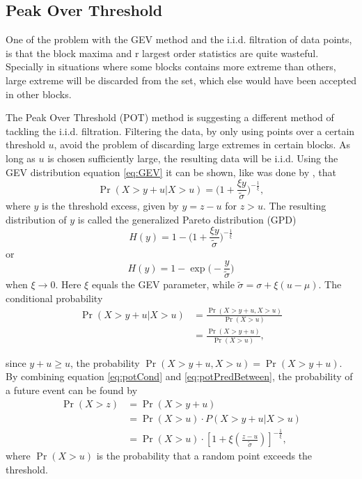 \subsection{Peak Over Threshold} 
One of the problem with the GEV method and the i.i.d. filtration of data points, is that the block maxima and r largest order statistics are quite wasteful. Specially in situations where some blocks contains more extreme than others, large extreme will be discarded from the set, which else would have been accepted in other blocks.

The Peak Over Threshold (POT) method is suggesting a different method of tackling the i.i.d. filtration. Filtering the data, by only using points over a certain threshold $u$, avoid the problem of discarding large extremes in certain blocks. As long as $u$ is chosen sufficiently large, the resulting data will be i.i.d. Using the GEV distribution equation \eqref{eq:GEV} it can be shown, like was done by \cite[p.~76]{stuart}, that 
\begin{equation}
\label{eq:potCond}
\Pr(X>y+u|X>u)=\Big(1+\frac{\xi y}{\tilde{\sigma}}\Big)^{-\frac{1}{\xi}},
\end{equation}
where $y$ is the threshold excess, given by $y=z-u$ for $z>u$.
The resulting distribution of $y$ is called the generalized Pareto distribution (GPD)
\begin{equation}
\label{eq:potwxi}
H(y)=1-\Big(1+\frac{\xi y}{\tilde{\sigma}}\Big)^{-\frac{1}{\xi}}
\end{equation}  
or
\begin{equation}
\label{eq:potwoxi}
H(y)=1-\exp\Big(-\frac{y}{\tilde{\sigma}}\Big)
\end{equation}
when $\xi \to 0$. Here $\xi$ equals the GEV parameter, while $\tilde{\sigma}=\sigma+\xi(u-\mu)$.
The conditional probability
\begin{align}
\Pr(X>y+u|X>u)& = \frac{\Pr(X>y+u,X>u)}{\Pr(X>u)} \nonumber\\
&=\frac{\Pr(X>y+u)}{\Pr(X>u)}, \label{eq:potPredBetween} 
\end{align}

since $y+u \geq u$, the probability $\Pr(X>y+u, X>u)=\Pr(X>y+u)$.
By combining equation \eqref{eq:potCond} and \eqref{eq:potPredBetween}, the probability of a future event can be found by
\begin{align}
\Pr(X>z)&=\Pr(X>y+u) \nonumber\\
 		&=\Pr(X>u) \cdot P(X>y+u|X>u)\nonumber\\
 		&=\Pr(X>u) \cdot \left[1+\xi \left( \frac{z-u}{\tilde{\sigma}}\right)\right]^{-\frac{1}{\xi}}, \label{eq:potPred}
\end{align}
where $\Pr(X>u)$ is the probability that a random point exceeds the threshold.


